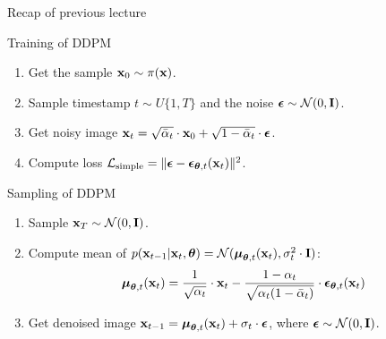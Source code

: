 \begin{frame}{Recap of previous lecture}
	\begin{block}{Training of DDPM}
		\begin{enumerate}
			\item Get the sample $\mathbf{x}_0 \sim \pi(\mathbf{x})$.
			\item Sample timestamp $t \sim U\{1, T\}$ and the noise $\boldsymbol{\epsilon} \sim \mathcal{N}(0, \mathbf{I})$.
			\item Get noisy image $\mathbf{x}_t = \sqrt{\bar{\alpha}_t} \cdot \mathbf{x}_0 + \sqrt{1 - \bar{\alpha}_t} \cdot \boldsymbol{\epsilon}$.
			\item Compute loss $ \mathcal{L}_{\text{simple}} = \| \boldsymbol{\epsilon} - \boldsymbol{\epsilon}_{\boldsymbol{\theta}, t}(\mathbf{x}_t) \|^2 $.
		\end{enumerate}
	\end{block}
	\begin{block}{Sampling of DDPM}
		\begin{enumerate}
			\item Sample $\mathbf{x}_T \sim \mathcal{N}(0, \mathbf{I})$.
			\item Compute mean of $p(\mathbf{x}_{t-1} | \mathbf{x}_t, \boldsymbol{\theta}) = \mathcal{N}(\boldsymbol{\mu}_{\boldsymbol{\theta}, t}(\mathbf{x}_t), \sigma_t^2 \cdot \mathbf{I})$:
			\[
				\boldsymbol{\mu}_{\boldsymbol{\theta}, t}(\mathbf{x}_t) = \frac{1}{\sqrt{\alpha_t}} \cdot \mathbf{x}_t - \frac{1 - \alpha_t}{\sqrt{\alpha_t (1 - \bar{\alpha}_t)}} \cdot \boldsymbol{\epsilon}_{\boldsymbol{\theta}, t}(\mathbf{x}_t)
			\]
			\vspace{-0.3cm}
			\item Get denoised image $\mathbf{x}_{t - 1} = \boldsymbol{\mu}_{\boldsymbol{\theta}, t}(\mathbf{x}_t) +  \sigma_t \cdot \boldsymbol{\epsilon}$, where $\boldsymbol{\epsilon} \sim \mathcal{N}(0, \mathbf{I})$.
		\end{enumerate}
	\end{block}
\end{frame}
